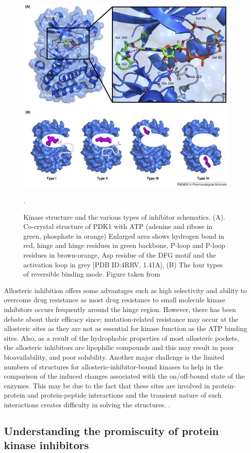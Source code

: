 \documentclass[a4paper, 11pt]{report}
\begin{document}
\begin{figure}[H]
	\includegraphics[width=.7\linewidth]{figures/kinase_inhibitors.jpg}
	\centering
	\caption{Kinase structure and the various types of inhibitor schematics. (A). Co-crystal structure of PDK1 with ATP (adenine and ribose in green, phosphate in orange) Enlarged area shows hydrogen bond in red, hinge and hinge residues in green backbone, P-loop and P-loop residues in brown-orange, Asp residue of the DFG motif  and the activation loop in grey [PDB ID:4RRV, 1.41A], (B) The four types of reversible binding  mode. Figure taken from \cite{wu2015fda}}.
	\label{type4inhibitor}
\end{figure}
Allosteric inhibition offers some advantages such as high selectivity and ability to overcome drug resistance as most drug resistance to small molecule kinase inhibitors occurs frequently around the hinge region. However, there has been debate about their efficacy since; mutation-related resistance may occur at the allosteric sites as they are not as essential for kinase function as the ATP binding sites. Also, as a result of the hydrophobic properties of most allosteric pockets, the allosteric inhibitors are lipophilic compounds and this may result in poor bioavailability, and poor solubility. Another major challenge is the limited numbers of structures for allosteric-inhibitor-bound kinases to help in the comparison of the induced changes associated with the on/off-bound state of the enzymes. This may be due to the fact that these sites are involved in protein-protein and protein-peptide interactions and the transient nature of such interactions creates difficulty in solving the structures. \cite{wu2015allosteric}.

\subsection{Understanding the promiscuity of protein kinase inhibitors}
\end{document}
